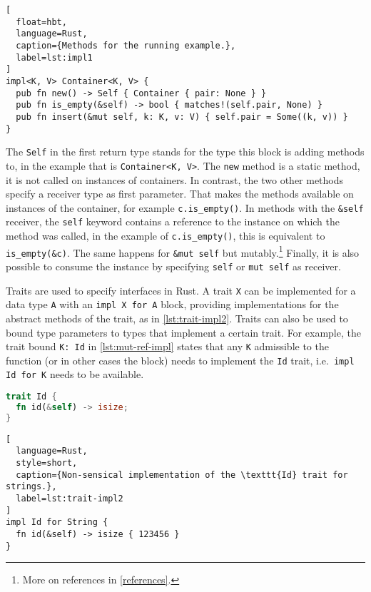 \begin{lstlisting}[
  float=hbt,
  language=Rust,
  caption={Methods for the running example.},
  label=lst:impl1
]
impl<K, V> Container<K, V> {
  pub fn new() -> Self { Container { pair: None } }
  pub fn is_empty(&self) -> bool { matches!(self.pair, None) }
  pub fn insert(&mut self, k: K, v: V) { self.pair = Some((k, v)) }
}
\end{lstlisting}

The \lstinline!Self! in the first return type stands for the type this block is
adding methods to, in the example that is \lstinline!Container<K, V>!. The
\lstinline!new! method is a static method, it is not called on instances of
containers. In contrast, the two other methods specify a receiver type as first
parameter. That makes the methods available on instances of the container, for
example \lstinline!c.is_empty()!. In methods with the \lstinline!&self!
receiver, the \lstinline!self! keyword contains a reference to the instance on
which the method was called, in the example of \lstinline!c.is_empty()!, this is
equivalent to \lstinline!is_empty(&c)!. The same happens for
\passthrough{\lstinline!&mut self!} but mutably.\footnote{More on references in
\autoref{references}.} Finally, it is also possible to consume the instance by
specifying \lstinline!self! or \passthrough{\lstinline!mut self!} as receiver.

Traits are used to specify interfaces in Rust. A trait \lstinline!X! can be
implemented for a data type \lstinline!A! with an \passthrough{\lstinline!impl X
for A!} block, providing implementations for the abstract methods of the trait,
as in \autoref{lst:trait-impl2}. Traits can also be used to bound type
parameters to types that implement a certain trait. For example, the trait bound
\lstinline!K: Id!  in \autoref{lst:mut-ref-impl} states that any \lstinline!K!
admissible to the function (or in other cases the block) needs to implement the
\lstinline!Id! trait, i.e.~\passthrough{\lstinline!impl Id for K!} needs to be
available.

\noindent\begin{minipage}[t]{.48\textwidth}
\begin{lstlisting}[language=Rust, style=short, caption={Rust trait with one abstract method.}, label=lst:trait-impl1]
trait Id {
  fn id(&self) -> isize;
}
\end{lstlisting}
\end{minipage}\hfill
\begin{minipage}[t]{.48\textwidth}
\begin{lstlisting}[
  language=Rust,
  style=short,
  caption={Non-sensical implementation of the \texttt{Id} trait for strings.},
  label=lst:trait-impl2
]
impl Id for String {
  fn id(&self) -> isize { 123456 }
}
\end{lstlisting}
\end{minipage}

